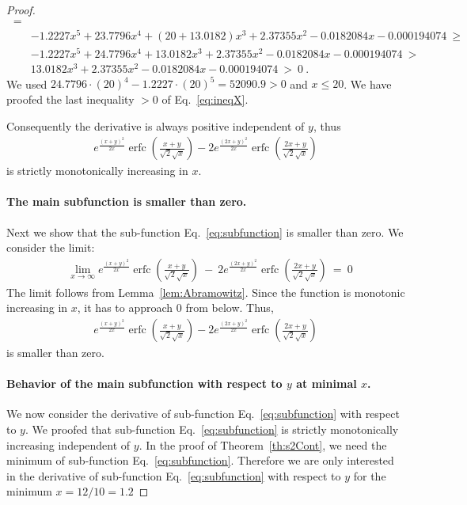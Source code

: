 \documentclass{article}
\renewcommand{\leq}{\leqslant}
\renewcommand{\geq}{\geqslant}
\DeclareMathOperator{\erfc}{erfc}
\begin{document}
\begin{proof}
\begin{align}
\ = \\ \nonumber &-1.2227 x^5+23.7796 x^4+(20+13.0182) x^3+2.37355 x^2-0.0182084 x-0.000194074\ \geq \\ \nonumber & -1.2227 x^5+24.7796 x^4+13.0182 x^3+2.37355 x^2-0.0182084 x-0.000194074\ > \\ \nonumber &13.0182 x^3+2.37355 x^2-0.0182084 x-0.000194074\ >\ 0\ .
\end{align}
We used $24.7796 \cdot (20)^4-1.2227 \cdot (20)^5= 52090.9>0 $ and $x \leq 20$.
We have proofed the last inequality $>0$ of Eq.~\eqref{eq:ineqX}.

Consequently the derivative is always positive independent of $y$,
thus 
\begin{align}
e^{\frac{(x+y)^2}{2 x}} \erfc \left(\frac{x+y}{\sqrt{2} \sqrt{x}}\right)-2 e^{\frac{(2 x+y)^2}{2 x}} \erfc \left(\frac{2 x+y}{\sqrt{2} \sqrt{x}}\right)
\end{align}
is strictly monotonically increasing in $x$.


\paragraph{The main subfunction is smaller than zero.} 
Next we show that the 
sub-function Eq.~\eqref{eq:subfunction} is smaller
than zero.
We consider the limit:
\begin{align}
&\lim_{x \to \infty}e^{\frac{(x+y)^2}{2 x}}
  \erfc \left(\frac{x+y}{\sqrt{2} \sqrt{x}}\right) \ - \ 2 e^{\frac{(2 x+y)^2}{2 x}} \erfc \left(\frac{2 x+y}{\sqrt{2} \sqrt{x}}\right)
\ = \ 0
\end{align}
The limit follows from Lemma~\ref{lem:Abramowitz}.
Since the function is monotonic increasing in $x$, it has to approach
$0$ from below. Thus,
\begin{align}
e^{\frac{(x+y)^2}{2 x}} \erfc \left(\frac{x+y}{\sqrt{2} \sqrt{x}}\right)-2 e^{\frac{(2 x+y)^2}{2 x}} \erfc \left(\frac{2 x+y}{\sqrt{2} \sqrt{x}}\right)
\end{align}
is smaller than zero.

\paragraph{Behavior of the main subfunction with respect to $y$ at minimal $x$.} 
We now consider the derivative of sub-function
Eq.~\eqref{eq:subfunction} with respect to $y$.
We proofed that sub-function
Eq.~\eqref{eq:subfunction} is  strictly monotonically increasing 
independent of $y$. 
In the proof of Theorem~\ref{th:s2Cont}, we need the minimum
of  sub-function
Eq.~\eqref{eq:subfunction}. Therefore we are only interested in the
derivative of sub-function
Eq.~\eqref{eq:subfunction} with respect to $y$
for the minimum $x=12/10=1.2$ 


\end{proof}
\end{document}
